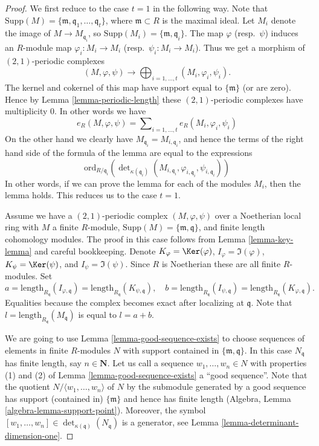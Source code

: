 \begin{proof}
We first reduce to the case $t = 1$ in the following way.
Note that
$\text{Supp}(M) = \{\mathfrak m, \mathfrak q_1, \ldots, \mathfrak q_t\}$,
where $\mathfrak m \subset R$ is the maximal ideal.
Let $M_i$ denote the image of $M \to M_{\mathfrak q_i}$,
so $\text{Supp}(M_i) = \{\mathfrak m, \mathfrak q_i\}$.
The map $\varphi$ (resp.\ $\psi$) induces an $R$-module map
$\varphi_i : M_i \to M_i$ (resp.\ $\psi_i : M_i \to M_i$).
Thus we get a morphism of $(2, 1)$-periodic complexes
$$
(M, \varphi, \psi) \longrightarrow
\bigoplus\nolimits_{i = 1, \ldots, t} (M_i, \varphi_i, \psi_i).
$$
The kernel and cokernel of this map have support equal to
$\{\mathfrak m\}$ (or are zero). Hence by Lemma \ref{lemma-periodic-length}
these $(2, 1)$-periodic complexes have multiplicity $0$.
In other words we have
$$
e_R(M, \varphi, \psi) =
\sum\nolimits_{i = 1, \ldots, t}
e_R(M_i, \varphi_i, \psi_i)
$$
On the other hand we clearly have $M_{\mathfrak q_i} = M_{i, \mathfrak q_i}$,
and hence the terms of the right hand side of the formula of the
lemma are equal to the expressions
$$
\text{ord}_{R/\mathfrak q_i}\left(
\det\nolimits_{\kappa(\mathfrak q_i)}
(M_{i, \mathfrak q_i}, \varphi_{i, \mathfrak q_i}, \psi_{i, \mathfrak q_i})
\right)
$$
In other words, if we can prove the lemma for each of the modules
$M_i$, then the lemma holds. This reduces us to the case $t = 1$.

\medskip\noindent
Assume we have a $(2, 1)$-periodic complex $(M, \varphi, \psi)$
over a Noetherian local ring with $M$ a finite $R$-module,
$\text{Supp}(M) = \{\mathfrak m, \mathfrak q\}$, and
finite length cohomology modules. The proof in this case
follows from Lemma \ref{lemma-key-lemma} and careful bookkeeping.
Denote
$K_\varphi = \Ker(\varphi)$,
$I_\varphi = \Im(\varphi)$,
$K_\psi = \Ker(\psi)$, and
$I_\psi = \Im(\psi)$.
Since $R$ is Noetherian these are all finite $R$-modules.
Set
$$
a = \text{length}_{R_{\mathfrak q}}(I_{\varphi, \mathfrak q})
= \text{length}_{R_{\mathfrak q}}(K_{\psi, \mathfrak q}),
\quad
b = \text{length}_{R_{\mathfrak q}}(I_{\psi, \mathfrak q})
= \text{length}_{R_{\mathfrak q}}(K_{\varphi, \mathfrak q}).
$$
Equalities because the complex becomes exact after localizing at
$\mathfrak q$. Note that $l = \text{length}_{R_{\mathfrak q}}(M_{\mathfrak q})$
is equal to $l = a + b$.

\medskip\noindent
We are going to use Lemma \ref{lemma-good-sequence-exists}
to choose sequences of elements in finite $R$-modules
$N$ with support contained in $\{\mathfrak m, \mathfrak q\}$.
In this case $N_{\mathfrak q}$ has finite length, say $n \in \mathbf{N}$.
Let us call a sequence $w_1, \ldots, w_n \in N$
with properties (1) and (2) of Lemma \ref{lemma-good-sequence-exists}
a ``good sequence''. Note that the quotient
$N/\langle w_1, \ldots, w_n \rangle$ of $N$ by the submodule generated by
a good sequence has support (contained in) $\{\mathfrak m\}$
and hence has finite length (Algebra, Lemma \ref{algebra-lemma-support-point}).
Moreover, the symbol
$[w_1, \ldots, w_n] \in \det_{\kappa(\mathfrak q)}(N_{\mathfrak q})$
is a generator, see Lemma \ref{lemma-determinant-dimension-one}.


\end{proof}
